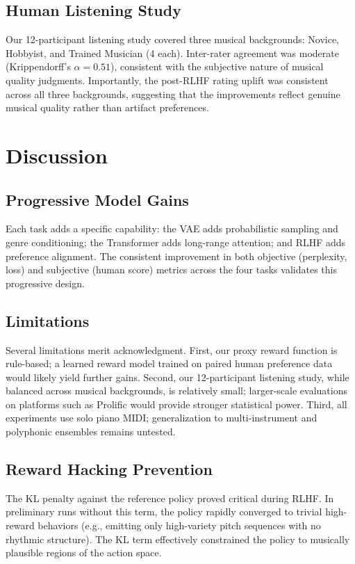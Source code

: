 \documentclass[conference]{IEEEtran}
\begin{document}
\subsection{Human Listening Study}
Our 12-participant listening study covered three musical backgrounds:
Novice, Hobbyist, and Trained Musician (4 each). Inter-rater agreement was
moderate (Krippendorff's $\alpha = 0.51$), consistent with the subjective
nature of musical quality judgments. Importantly, the post-RLHF rating
uplift was consistent across all three backgrounds, suggesting that the
improvements reflect genuine musical quality rather than artifact
preferences.

\section{Discussion} \label{sec:discussion}

\subsection{Progressive Model Gains}
Each task adds a specific capability: the VAE adds probabilistic sampling
and genre conditioning; the Transformer adds long-range attention; and
RLHF adds preference alignment. The consistent improvement in both
objective (perplexity, loss) and subjective (human score) metrics across
the four tasks validates this progressive design.

\subsection{Limitations}
Several limitations merit acknowledgment. First, our proxy reward function
is rule-based; a learned reward model trained on paired human preference
data would likely yield further gains. Second, our 12-participant listening
study, while balanced across musical backgrounds, is relatively small;
larger-scale evaluations on platforms such as Prolific would provide
stronger statistical power. Third, all experiments use solo piano MIDI;
generalization to multi-instrument and polyphonic ensembles remains
untested.

\subsection{Reward Hacking Prevention}
The KL penalty against the reference policy proved critical during RLHF.
In preliminary runs without this term, the policy rapidly converged to
trivial high-reward behaviors (e.g., emitting only high-variety pitch
sequences with no rhythmic structure). The KL term effectively constrained
the policy to musically plausible regions of the action space.
\end{document}

